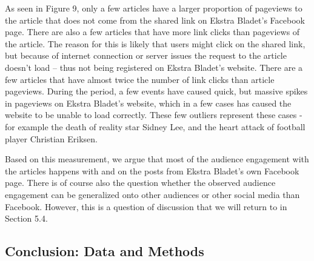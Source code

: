 \documentclass[
]{article}
\begin{document}
\noindent As seen in Figure 9, only a few articles have a larger
proportion of pageviews to the article that does not come from the
shared link on Ekstra Bladet's Facebook page. There are also a few
articles that have more link clicks than pageviews of the article. The
reason for this is likely that users might click on the shared link, but
because of internet connection or server issues the request to the
article doesn't load -- thus not being registered on Ekstra Bladet's
website. There are a few articles that have almost twice the number of
link clicks than article pageviews. During the period, a few events have
caused quick, but massive spikes in pageviews on Ekstra Bladet's
website, which in a few cases has caused the website to be unable to
load correctly. These few outliers represent these cases - for example
the death of reality star Sidney Lee, and the heart attack of football
player Christian Eriksen.

Based on this measurement, we argue that most of the audience engagement
with the articles happens with and on the posts from Ekstra Bladet's own
Facebook page. There is of course also the question whether the observed
audience engagement can be generalized onto other audiences or other
social media than Facebook. However, this is a question of discussion
that we will return to in Section 5.4.

\hypertarget{conclusion-data-and-methods}{%
\subsection{Conclusion: Data and
Methods}\label{conclusion-data-and-methods}}
\end{document}
